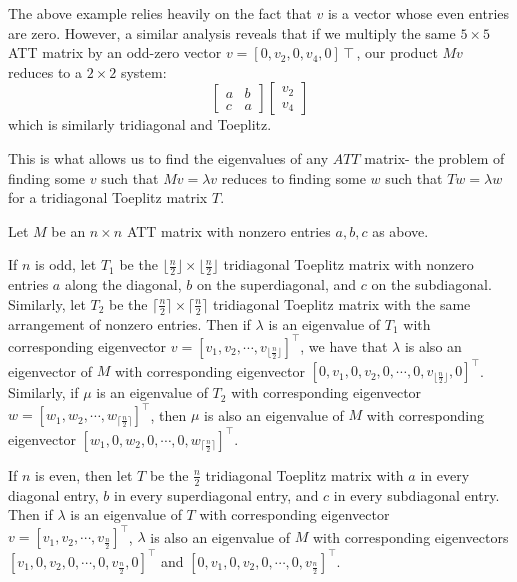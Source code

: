 \documentclass[10pt,twocolumn]{article}
\begin{document}
The above example relies heavily on the fact that $v$ is a vector whose even entries are zero. However, a similar analysis reveals that if we multiply the same $5\times 5$ ATT matrix by an odd-zero vector $v=[0,v_2,0,v_4,0]\intercal$, our product $Mv$ reduces to a $2\times 2$ system:
$$\begin{bmatrix}
    a & b \\
    c & a
\end{bmatrix}\begin{bmatrix}
    v_2 \\
    v_4
\end{bmatrix}$$
which is similarly tridiagonal and Toeplitz.

This is what allows us to find the eigenvalues of any $ATT$ matrix- the problem of finding some $v$ such that $Mv=\lambda v$ reduces to finding some $w$ such that $Tw=\lambda w$ for a tridiagonal Toeplitz matrix $T$.

\begin{thm}\label{bigboy}
    Let $M$ be an $n\times n$ ATT matrix with nonzero entries $a,b,c$ as above. 
    
    If $n$ is odd, let $T_1$ be the $\lfloor \frac{n}{2} \rfloor \times \lfloor \frac{n}{2} \rfloor$ tridiagonal Toeplitz matrix with nonzero entries $a$ along the diagonal, $b$ on the superdiagonal, and $c$ on the subdiagonal. Similarly, let $T_2$ be the $\lceil \frac{n}{2} \rceil \times \lceil \frac{n}{2} \rceil$ tridiagonal Toeplitz matrix with the same arrangement of nonzero entries. Then if $\lambda$ is an eigenvalue of $T_1$ with corresponding eigenvector $v=[v_1,v_2,\cdots, v_{\lfloor \frac{n}{2} \rfloor}]^\intercal$, we have that $\lambda$ is also an eigenvector of $M$ with corresponding eigenvector $[0,v_1,0,v_2,0,\cdots,0,v_{\lfloor \frac{n}{2} \rfloor}, 0]^\intercal$. Similarly, if $\mu$ is an eigenvalue of $T_2$ with corresponding eigenvector $w=[w_1,w_2,\cdots, w_{\lceil \frac{n}{2} \rceil}]^\intercal$, then $\mu$ is also an eigenvalue of $M$ with corresponding eigenvector $[w_1,0,w_2,0,\cdots,0,w_{\lceil \frac{n}{2} \rceil}]^\intercal$.

    If $n$ is even, then let $T$ be the $\frac{n}{2}$ tridiagonal Toeplitz matrix with $a$ in every diagonal entry, $b$ in every superdiagonal entry, and $c$ in every subdiagonal entry. Then if $\lambda$ is an eigenvalue of $T$ with corresponding eigenvector $v=[v_1,v_2,\cdots, v_\frac{n}{2}]^\intercal$, $\lambda$ is also an eigenvalue of $M$ with corresponding eigenvectors $[v_1,0,v_2,0,\cdots,0,v_\frac{n}{2},0]^\intercal$ and $[0,v_1,0,v_2,0,\cdots,0,v_\frac{n}{2}]^\intercal$.
\end{thm}
\end{document}
